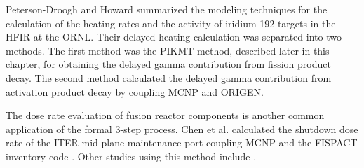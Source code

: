 Peterson-Droogh and Howard \cite{peterson-droogh_current_2018} summarized the modeling techniques for the calculation of the heating rates and the activity of iridium-192 targets in the \gls*{HFIR} at the \gls*{ORNL}.
Their delayed heating calculation was separated into two methods.
The first method was the PIKMT method, described later in this chapter, for obtaining the delayed gamma contribution from fission product decay.
The second method calculated the delayed gamma contribution from activation product decay by coupling MCNP and ORIGEN.

The dose rate evaluation of fusion reactor components is another common application of the formal 3-step process.
Chen et al. \cite{chen_rigorous_2002} calculated the shutdown dose rate of the \gls*{ITER} mid-plane maintenance port coupling MCNP and the FISPACT inventory code \cite{forrest_fispact_1998}.
Other studies using this method include \cite{serikov_advanced_2002, sauvan_development_2016}.

